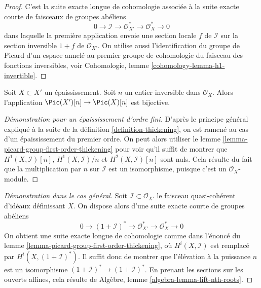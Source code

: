 \begin{proof}
C'est la suite exacte longue de cohomologie associée à la
suite exacte courte de faisceaux de groupes abéliens
$$
0 \to \mathcal{I} \to \mathcal{O}_{X'}^* \to \mathcal{O}_X^* \to 0
$$
dans laquelle la première application envoie une section locale $f$ de $\mathcal{I}$
sur la section inversible $1 + f$ de $\mathcal{O}_{X'}$.
On utilise aussi l'identification du groupe de Picard d'un
espace annelé au premier groupe de cohomologie du faisceau
des fonctions inversibles, voir
Cohomologie, lemme \ref{cohomology-lemma-h1-invertible}.
\end{proof}

\begin{lemma}
\label{lemma-torsion-pic-thickening}
Soit $X \subset X'$ un épaississement. Soit $n$ un entier
inversible dans $\mathcal{O}_X$. Alors l'application
$\Pic(X')[n] \to \Pic(X)[n]$ est bijective.
\end{lemma}

\begin{proof}[Démonstration pour un épaississement d'ordre fini]
D'après le principe général expliqué à la suite de
la définition \ref{definition-thickening},
on est ramené au cas d'un épaississement du premier ordre.
On peut alors utiliser le lemme \ref{lemma-picard-group-first-order-thickening}
pour voir qu'il suffit de montrer que
$H^1(X, \mathcal{I})[n]$, $H^1(X, \mathcal{I})/n$ et
$H^2(X, \mathcal{I})[n]$ sont nuls.
Cela résulte du fait que la multiplication par $n$ sur $\mathcal{I}$
est un isomorphisme, puisque c'est un $\mathcal{O}_X$-module.
\end{proof}

\begin{proof}[Démonstration dans le cas général]
Soit $\mathcal{I} \subset \mathcal{O}_{X'}$ le faisceau quasi-cohérent d'idéaux
définissant $X$. On dispose alors d'une suite exacte courte de
groupes abéliens
$$
0 \to (1 + \mathcal{I})^* \to \mathcal{O}_{X'}^* \to \mathcal{O}_X^* \to 0
$$
On obtient une suite exacte longue de cohomologie comme dans l'énoncé du
lemme \ref{lemma-picard-group-first-order-thickening},
où $H^i(X, \mathcal{I})$ est remplacé par $H^i(X, (1 + \mathcal{I})^*)$.
Il suffit donc de montrer que l'élévation à la puissance $n$ est un
isomorphisme $(1 + \mathcal{I})^* \to (1 + \mathcal{I})^*$.
En prenant les sections sur les ouverts affines, cela résulte de
Algèbre, lemme \ref{algebra-lemma-lift-nth-roots}.
\end{proof}






